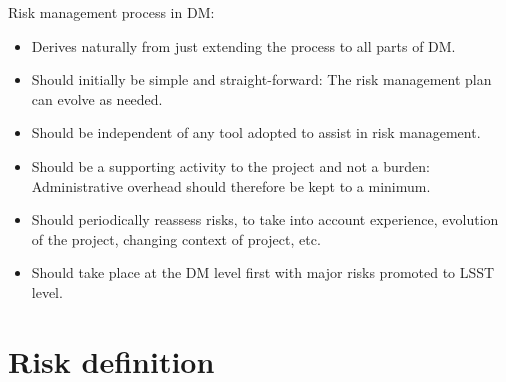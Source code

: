 \documentclass[DM,lsstdraft,PL]{lsstdoc}
\begin{document}
Risk management process in DM:
\begin{itemize}
\item Derives naturally from  just extending the process to all parts of DM.
\item Should initially be simple and straight-forward: The risk management plan can evolve as needed.
\item Should be independent of any tool adopted to assist in risk management.
\item Should be a supporting activity to the project and not a burden: Administrative overhead should therefore be kept to a minimum.
\item Should periodically reassess risks, to take into account experience, evolution of the project, changing context of project, etc.
\item Should take place at the DM level first with major risks promoted to LSST level.
\end{itemize}


\section{Risk definition \label{sect:definition}}




\end{document}
